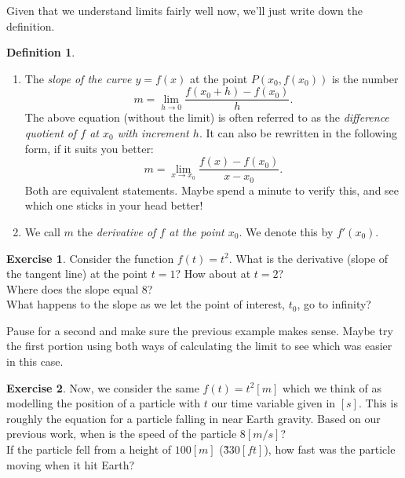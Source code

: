 \documentclass[leqno]{article}
\theoremstyle{definition}
\newtheorem{definition}{Definition}[section]
\newtheorem{exercise}{Exercise}[section]
\theoremstyle{remark}
\theoremstyle{theorem}
\begin{document}
Given that we understand limits fairly well now, we'll just write down the definition.

\begin{definition}
\begin{enumerate}[1.]
\item The \emph{slope of the curve $y=f(x)$} at the point $P(x_0,f(x_0))$ is the number
\[
m=\lim_{h\to 0} \frac{f(x_0+h)-f(x_0)}{h}.
\]
The above equation (without the limit) is often referred to as the \emph{difference quotient of $f$ at $x_0$ with increment $h$}. It can also be rewritten in the following form, if it suits you better:
\[
m=\lim_{x\to x_0} \frac{f(x)-f(x_0)}{x-x_0}.
\]
Both are equivalent statements.  Maybe spend a minute to verify this, and see which one sticks in your head better!
\item We call $m$ the \emph{derivative of $f$ at the point $x_0$}. We denote this by $f'(x_0)$.
\end{enumerate} 
\end{definition}

\begin{exercise}
Consider the function $f(t)=t^2$.  What is the derivative (slope of the tangent line) at the point $t=1$?  How about at $t=2$?
\vspace*{5cm}\\
Where does the slope equal $8$? 
\vspace*{4cm}\\
What happens to the slope as we let the point of interest, $t_0$, go to infinity?
\vspace*{4cm}\\
\end{exercise}

Pause for a second and make sure the previous example makes sense. Maybe try the first portion using both ways of calculating the limit to see which was easier in this case.

\begin{exercise}
Now, we consider the same $f(t)=t^2[m]$ which we think of as modelling the position of a particle with $t$ our time variable given in $[s]$.  This is roughly the equation for a particle falling in near Earth gravity.  Based on our previous work, when is the speed of the particle $8[m/s]$? 
\vspace*{2cm}\\
If the particle fell from a height of $100[m]$ (\~ 330$[ft]$), how fast was the particle moving when it hit Earth?  
\end{exercise}
\end{document}

